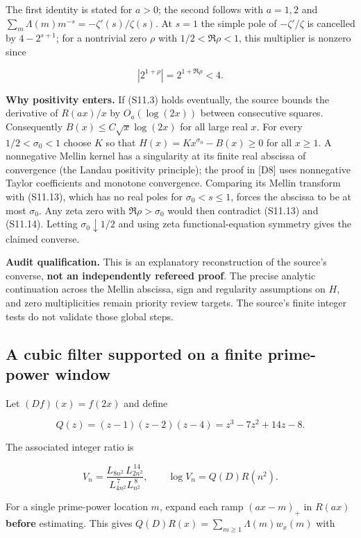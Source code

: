 \documentclass[
  10pt,
  a4paper,
  10pt,
  oneside,
  openany]{book}
\begin{document}
The first identity is stated for \(a>0\); the second follows with
\(a=1,2\) and \(\sum_m\Lambda(m)m^{-s}=-\zeta'(s)/\zeta(s)\). At \(s=1\)
the simple pole of \(-\zeta'/\zeta\) is cancelled by \(4-2^{s+1}\); for
a nontrivial zero \(\rho\) with \(1/2<\Re\rho<1\), this multiplier is
nonzero since

\[
\left|2^{1+\rho}\right|=2^{1+\Re\rho}<4.
\tag{S11.14}\label{eq:S11.14}
\]

\textbf{Why positivity enters.} If (S11.3) holds eventually, the source
bounds the derivative of \(R(ax)/x\) by \(O_a(\log(2x))\) between
consecutive squares. Consequently \(B(x)\le C\sqrt x\log(2x)\) for all
large real \(x\). For every \(1/2<\sigma_0<1\) choose \(K\) so that
\(H(x)=Kx^{\sigma_0}-B(x)\ge0\) for all \(x\ge1\). A nonnegative Mellin
kernel has a singularity at its finite real abscissa of convergence (the
Landau positivity principle); the proof in {[}D8{]} uses nonnegative
Taylor coefficients and monotone convergence. Comparing its Mellin
transform with (S11.13), which has no real poles for \(\sigma_0<s\le1\),
forces the abscissa to be at most \(\sigma_0\). Any zeta zero with
\(\Re\rho>\sigma_0\) would then contradict (S11.13) and (S11.14).
Letting \(\sigma_0\downarrow1/2\) and using zeta functional-equation
symmetry gives the claimed converse.

\textbf{Audit qualification.} This is an explanatory reconstruction of
the source's converse, \textbf{not an independently refereed proof}. The
precise analytic continuation across the Mellin abscissa, sign and
regularity assumptions on \(H\), and zero multiplicities remain priority
review targets. The source's finite integer tests do not validate those
global steps.

\subsection{A cubic filter supported on a finite prime-power
window}\label{a-cubic-filter-supported-on-a-finite-prime-power-window}

Let \((Df)(x)=f(2x)\) and define

\[
Q(z)=(z-1)(z-2)(z-4)=z^3-7z^2+14z-8.
\tag{S11.15}\label{eq:S11.15}
\]

The associated integer ratio is

\[
V_n=\frac{L_{8n^2}\,L_{2n^2}^{\,14}}{L_{4n^2}^{\,7}L_{n^2}^{\,8}},
\qquad
\log V_n=Q(D)R(n^2).
\tag{S11.16}\label{eq:S11.16}
\]

For a single prime-power location \(m\), expand each ramp \((ax-m)_+\)
in \(R(ax)\) \textbf{before} estimating. This gives
\(Q(D)R(x)=\sum_{m\ge1}\Lambda(m)w_x(m)\) with
\end{document}
